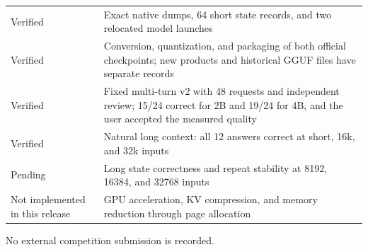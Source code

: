 \documentclass[10pt,a4paper]{article}
\begin{document}
\begin{longtable}[]{@{}ll@{}}
\begin{minipage}[t]{0.47\columnwidth}
Verified\strut
\end{minipage} & \begin{minipage}[t]{0.47\columnwidth}\raggedright
Exact native dumps, 64 short state records, and two relocated model
launches\strut
\end{minipage}\tabularnewline
\begin{minipage}[t]{0.47\columnwidth}\raggedright
Verified\strut
\end{minipage} & \begin{minipage}[t]{0.47\columnwidth}\raggedright
Conversion, quantization, and packaging of both official checkpoints;
new products and historical GGUF files have separate records\strut
\end{minipage}\tabularnewline
\begin{minipage}[t]{0.47\columnwidth}\raggedright
Verified\strut
\end{minipage} & \begin{minipage}[t]{0.47\columnwidth}\raggedright
Fixed multi-turn v2 with 48 requests and independent review; 15/24
correct for 2B and 19/24 for 4B, and the user accepted the measured
quality\strut
\end{minipage}\tabularnewline
\begin{minipage}[t]{0.47\columnwidth}\raggedright
Verified\strut
\end{minipage} & \begin{minipage}[t]{0.47\columnwidth}\raggedright
Natural long context: all 12 answers correct at short, 16k, and 32k
inputs\strut
\end{minipage}\tabularnewline
\begin{minipage}[t]{0.47\columnwidth}\raggedright
Pending\strut
\end{minipage} & \begin{minipage}[t]{0.47\columnwidth}\raggedright
Long state correctness and repeat stability at 8192, 16384, and 32768
inputs\strut
\end{minipage}\tabularnewline
\begin{minipage}[t]{0.47\columnwidth}\raggedright
Not implemented in this release\strut
\end{minipage} & \begin{minipage}[t]{0.47\columnwidth}\raggedright
GPU acceleration, KV compression, and memory reduction through page
allocation\strut
\end{minipage}\tabularnewline
\bottomrule
\end{longtable}

No external competition submission is recorded.
\end{document}
